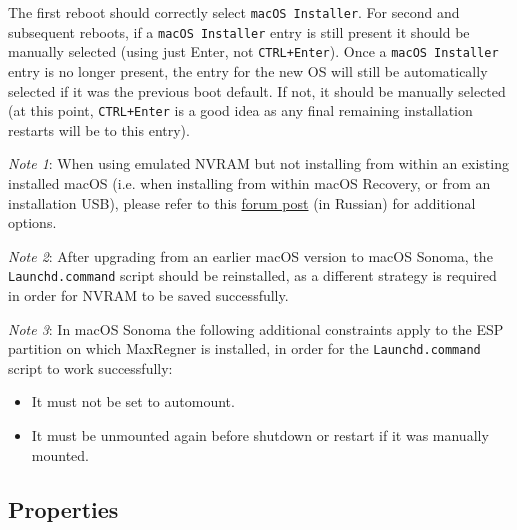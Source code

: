 \documentclass[]{article}
\providecommand{\tightlist}{%
  \setlength{\itemsep}{0pt}\setlength{\parskip}{0pt}}
\begin{document}
The first reboot should correctly select \texttt{macOS Installer}. For second and subsequent reboots, if a \texttt{macOS Installer}
entry is still present it should be manually selected (using just Enter, not \texttt{CTRL+Enter}). Once a \texttt{macOS Installer}
entry is no longer present, the entry for the new OS will still be automatically selected if it was the previous boot default.
If not, it should be manually selected (at this point, \texttt{CTRL+Enter} is a good idea as any final remaining installation restarts
will be to this entry).

\emph{Note 1}: When using emulated NVRAM but not installing from within an existing installed macOS (i.e. when installing from
within macOS Recovery, or from an installation USB), please refer to this
\href{https://applelife.ru/posts/916248}{forum post} (in Russian)
for additional options.

\emph{Note 2}: After upgrading from an earlier macOS version to macOS Sonoma, the \texttt{Launchd.command} script should be
reinstalled, as a different strategy is required in order for NVRAM to be saved successfully.

\emph{Note 3}: In macOS Sonoma the following additional constraints apply to the ESP partition on which
MaxRegner is installed, in order for the \texttt{Launchd.command} script to work successfully:

\begin{itemize}
\tightlist
 \item It must not be set to automount.
 \item It must be unmounted again before shutdown or restart if it was manually mounted.
\end{itemize}

\subsection{Properties}\label{uefiprops}
\end{document}
